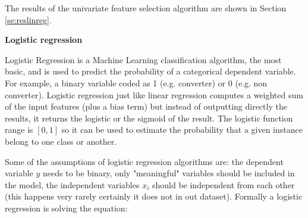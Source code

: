 \documentclass[11pt]{article}
\theoremstyle{definition}
\theoremstyle{remark}
\begin{document}
The results of the univariate feature selection algorithm are shown in Section \ref{se:reslinreg}. 

\textbf{Logistic regression}

Logistic Regression is a Machine Learning classification algorithm, the most basic, and is used to predict the probability of a categorical dependent variable. For example, a binary variable coded as 1 (e.g. converter) or 0 (e.g. non converter). Logistic regression just like linear regression computes a weighted sum of the input features (plus a bias term) but instead of outputting directly the results, it returns the logistic or the sigmoid of the result. The logistic function range is $[0,1]$ so it can be used to estimate the probability that a given instance belong to one class or another. 

Some of the assumptions of logistic regression algorithms are: the dependent variable $y$ needs to be binary, only "meaningful" variables should be included in the model, the independent variables $x_i$ should be independent from each other (this happens very rarely certainly it does not in out dataset). Formally a logistic regression is solving the equation:  
\end{document}
